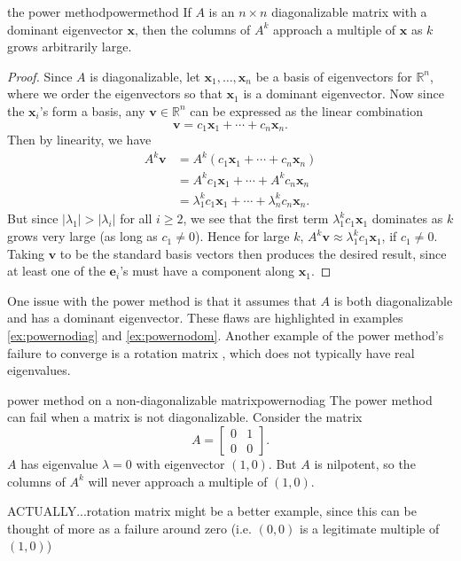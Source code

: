 \documentclass{article}
\let\vec\mathbf
\begin{document}
\begin{theorem}{the power method}{powermethod}
  If $A$ is an $n \times n$ diagonalizable matrix with a dominant eigenvector $\vec{x}$, then the columns of $A^k$ approach a multiple of $\vec{x}$ as $k$ grows arbitrarily large.
\end{theorem}
\begin{proof}
  Since $A$ is diagonalizable, let $\vec{x}_1, \ldots, \vec{x}_n$ be a basis of eigenvectors for $\mathbb{R}^n$, where we order the eigenvectors so that $\vec{x}_1$ is a dominant eigenvector. Now since the $\vec{x}_i$'s form a basis, any $\vec{v} \in \mathbb{R}^n$ can be expressed as the linear combination
  \begin{equation*}
    \vec{v} = c_1\vec{x}_1 + \cdots + c_n\vec{x}_n.
  \end{equation*}
  Then by linearity, we have
  \begin{align*}
    A^k\vec{v} &= A^k(c_1\vec{x}_1 + \cdots + c_n\vec{x}_n) \\
               &= A^kc_1\vec{x}_1 + \cdots + A^kc_n\vec{x}_n \\
               &= \lambda_1^kc_1\vec{x}_1 + \cdots + \lambda_n^kc_n\vec{x}_n.
  \end{align*}
  But since $|\lambda_1| > |\lambda_i|$ for all $i \geq 2$, we see that the first term $\lambda_1^kc_1\vec{x}_1$ dominates as $k$ grows very large (as long as $c_1 \neq 0$). Hence for large $k$, $A^k\vec{v} \approx \lambda_1^kc_1\vec{x}_1$, if $c_1 \neq 0$. Taking $\vec{v}$ to be the standard basis vectors then produces the desired result, since at least one of the $\vec{e}_i$'s must have a component along $\vec{x}_1$.
\end{proof}

One issue with the power method is that it assumes that $A$ is both diagonalizable and has a dominant eigenvector. These flaws are highlighted in examples \ref{ex:powernodiag} and \ref{ex:powernodom}. Another example of the power method's failure to converge is a rotation matrix \cite{pwr-rot}, which does not typically have real eigenvalues.

\begin{example}{power method on a non-diagonalizable matrix}{powernodiag}
  The power method can fail when a matrix is not diagonalizable. Consider the matrix
  \begin{equation*}
    A = \begin{bmatrix}0 & 1 \\ 0 & 0\end{bmatrix}.
  \end{equation*}
  $A$ has eigenvalue $\lambda = 0$ with eigenvector $(1, 0)$. But $A$ is nilpotent, so the columns of $A^k$ will never approach a multiple of $(1, 0)$.

  ACTUALLY...rotation matrix might be a better example, since this can be thought of more as a failure around zero (i.e. $(0,0)$ is a legitimate multiple of $(1,0)$)
\end{example}
\end{document}

